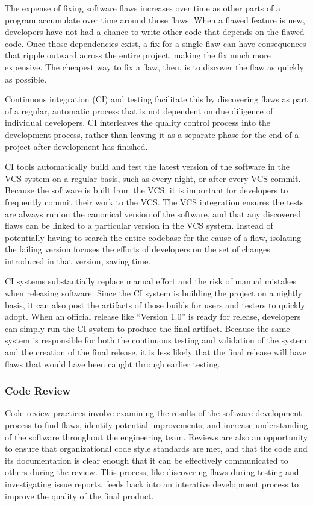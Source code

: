 The expense of fixing software flaws increases over time as other
parts of a program accumulate over time around those flaws. When a
flawed feature is new, developers have not had a chance to write other
code that depends on the flawed code. Once those dependencies exist, a
fix for a single flaw can have consequences that ripple outward across
the entire project, making the fix much more expensive. The cheapest
way to fix a flaw, then, is to discover the flaw as quickly as
possible.

Continuous integration (CI) and testing facilitate this by discovering
flaws as part of a regular, automatic process that is not dependent on
due diligence of individual developers. CI interleaves the quality
control process into the development process, rather than leaving it
as a separate phase for the end of a project after development has
finished.

CI tools automatically build and test the latest version of the
software in the VCS system on a regular basis, such as every night, or
after every VCS commit. Because the software is built from the VCS, it
is important for developers to frequently commit their work to the
VCS. The VCS integration ensures the tests are always run on the
canonical version of the software, and that any discovered flaws can
be linked to a particular version in the VCS system. Instead of
potentially having to search the entire codebase for the cause of a
flaw, isolating the failing version focuses the efforts of developers
on the set of changes introduced in that version, saving time.

CI systems substantially replace manual effort and the risk of manual
mistakes when releasing software. Since the CI system is building the
project on a nightly basis, it can also post the artifacts of those
builds for users and testers to quickly adopt. When an official
release like ``Version 1.0'' is ready for release, developers can
simply run the CI system to produce the final artifact. Because the
same system is responsible for both the continuous testing and
validation of the system and the creation of the final release, it is
less likely that the final release will have flaws that would have
been caught through earlier testing.

\subsubsection{Code Review}

Code review practices involve examining the results of the software
development process to find flaws, identify potential improvements,
and increase understanding of the software throughout the engineering
team. Reviews are also an opportunity to ensure that organizational
code style standards are met, and that the code and its documentation
is clear enough that it can be effectively communicated to others
during the review. This process, like discovering flaws during
testing and investigating issue reports, feeds back into an interative
development process to improve the quality of the final product.

